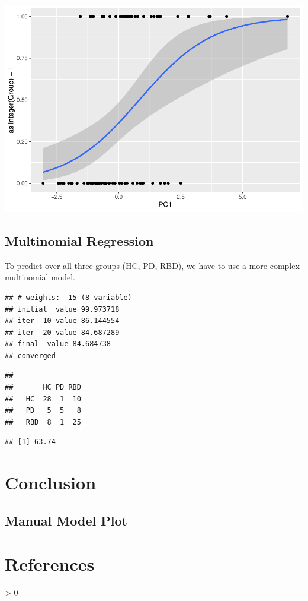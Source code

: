 \documentclass[
  english,
  doc,floatsintext]{apa6}
\newlength{\cslhangindent}
\newenvironment{CSLReferences}[2] %
 {%
  \setlength{\parindent}{0pt}
  \ifodd #1 \everypar{\setlength{\hangindent}{\cslhangindent}}\ignorespaces\fi
  \ifnum #2 > 0
  \setlength{\parskip}{#2\baselineskip}
  \fi
 }%
 {}
\begin{document}
\includegraphics{dap_report_anja_probst_files/figure-latex/compare PCA-based model to best model from eval-2.pdf}

\hypertarget{multinomial-regression}{%
\subsection{Multinomial Regression}\label{multinomial-regression}}

To predict over all three groups (HC, PD, RBD), we have to use a more complex
multinomial model.

\begin{verbatim}
## # weights:  15 (8 variable)
## initial  value 99.973718 
## iter  10 value 86.144554
## iter  20 value 84.687289
## final  value 84.684738 
## converged
\end{verbatim}

\begin{verbatim}
##      
##       HC PD RBD
##   HC  28  1  10
##   PD   5  5   8
##   RBD  8  1  25
\end{verbatim}

\begin{verbatim}
## [1] 63.74
\end{verbatim}

\clearpage

\hypertarget{conclusion}{%
\section{Conclusion}\label{conclusion}}

\clearpage

\hypertarget{manual-model-plot}{%
\subsection{Manual Model Plot}\label{manual-model-plot}}

\clearpage

\hypertarget{references}{%
\section{References}\label{references}}

\begingroup
\setlength{\parindent}{-0.5in}
\setlength{\leftskip}{0.5in}

\hypertarget{refs}{}
\begin{CSLReferences}{0}{0}
\end{CSLReferences}

\endgroup
\end{document}
